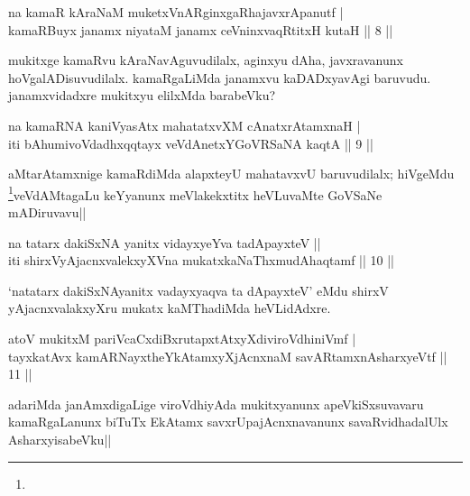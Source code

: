 \begin{shl}
na kamaR kAraNaM muketxVnARginxgaRhajavxrApanutf | \\
kamaRBuyx janamx niyataM janamx ceVninxvaqRtitxH kutaH \hfill|| 8 || 
\end{shl}

\begin{artha}
mukitxge kamaRvu kAraNavAguvudilalx, aginxyu dAha, javxravanunx 
hoVgalADisuvudilalx. kamaRgaLiMda janamxvu kaDADxyavAgi baruvudu. 
janamxvidadxre mukitxyu elilxMda barabeVku?
\end{artha}


\begin{shl}
na kamaRNA kaniVyasAtx mahatatxvXM cAnatxrAtamxnaH | \\
iti bAhumivoVdadhxqqtayx veVdAnetxYGoVRSaNA kaqtA \hfill|| 9  || 
\end{shl}

\begin{artha}
aMtarAtamxnige kamaRdiMda alapxteyU mahatavxvU baruvudilalx; hiVgeMdu 
\footnote[1]{}veVdAMtagaLu keYyanunx meVlakekxtitx heVLuvaMte GoVSaNe 
mADiruvavu||
\end{artha}


\begin{shl}
na tatarx dakiSxNA yanitx vidayxyeYva tadApayxteV || \\
iti shirxVyAjacnxvalekxyXVna mukatxkaNaThxmudAhaqtamf \hfill || 10 || 
\end{shl}

\begin{artha}
`natatarx dakiSxNAyanitx vadayxyaqva ta dApayxteV' eMdu shirxV 
yAjacnxvalakxyXru mukatx kaMThadiMda heVLidAdxre.
\end{artha}

\begin{shl}
atoV mukitxM pariVcaCxdiBxrutapxtAtxyXdiviroVdhiniVmf | \\
tayxkatAvx kamARNayxtheYkAtamxyXjAcnxnaM savARtamxnA\s \s sharxyeVtf \hfill|| 11 || 
\end{shl}

\begin{artha}
adariMda janAmxdigaLige viroVdhiyAda mukitxyanunx apeVkiSxsuvavaru 
kamaRgaLanunx biTuTx EkAtamx savxrUpajAcnxnavanunx savaRvidhadalUlx 
AsharxyisabeVku||
\end{artha}

